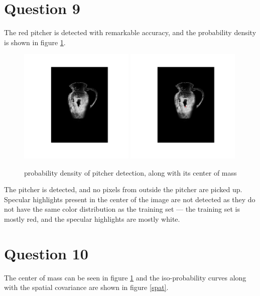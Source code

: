 \section*{Question 9}
The red pitcher is detected with remarkable accuracy, and the probability density is shown in figure \ref{pitcher}.
\begin{figure}[h!]
  \centering
\includegraphics[width=0.49\textwidth]{pitcher}
\includegraphics[width=0.49\textwidth]{centerOfMass}
\caption{ probability density of pitcher detection, along with its center of mass }
\label{pitcher}
\end{figure}
The pitcher is detected, and no pixels from outside the pitcher are picked up. Specular highlights present in the center of the image are not detected as they do not have the same color distribution as the training set --- the training set is mostly red, and the specular highlights are mostly white. 

\section*{Question 10}
The center of mass can be seen in figure \ref{pitcher} and the iso-probability curves along with the spatial covariance are shown in figure \ref{spat}. 

